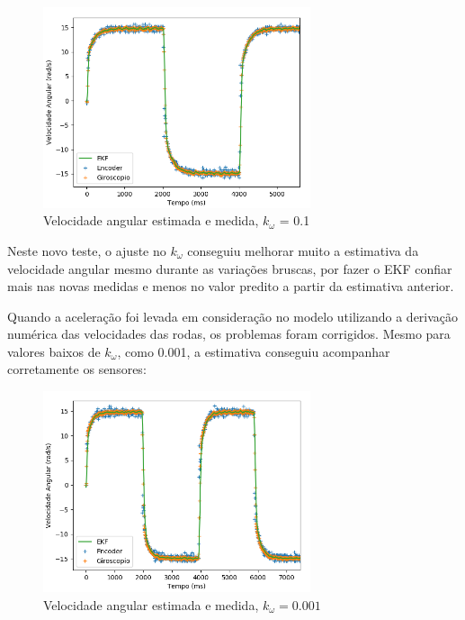 \documentclass[
	12pt,				%
	openright,			%
	twoside,			%
	convert,
	a4paper,			%
	english,			%
	french,				%
	spanish,			%
	brazil				%
	]{abntex2}
\begin{document}
\begin{figure}[H]
	\caption{Velocidade angular estimada e medida, $k_\omega$ = 0.1}
\begin{center}
   \includegraphics[width=0.7\textwidth]{process_noise_1_2}
\end{center}
\end{figure}
Neste novo teste, o ajuste no $k_\omega$ conseguiu melhorar muito a estimativa da velocidade angular mesmo durante as variações bruscas, por fazer o EKF confiar mais nas novas medidas e menos no valor predito a partir da estimativa anterior.
\par
Quando a aceleração foi levada em consideração no modelo utilizando a derivação numérica das velocidades das rodas, os problemas foram corrigidos. Mesmo para valores baixos de $k_\omega$, como 0.001, a estimativa conseguiu acompanhar corretamente os sensores:
\begin{figure}[H]
	\caption{Velocidade angular estimada e medida, $k_\omega = 0.001$}
\begin{center}
   \includegraphics[width=0.7\textwidth]{process_noise_acc_2}
\end{center}
\end{figure}
\par
\end{document}
